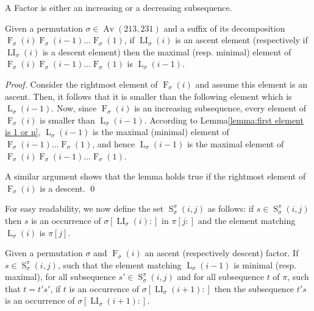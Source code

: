 \documentclass[a4paper]{llncs}
\DeclareMathOperator{\AV}{Av}
\newcommand{\ptext}{\pi}
\newcommand{\pmotif}{\sigma}
\DeclareMathOperator{\firsta}{L}
\newcommand{\first}[2]{\firsta_{{#1}}({#2})}
\DeclareMathOperator{\firstia}{LI}
\newcommand{\firsti}[2]{\firstia_{{#1}}({#2})}
\DeclareMathOperator{\factora}{F}
\newcommand{\factor}[2]{\factora_{{#1}}({#2})}
\DeclareMathOperator{\SETa}{S}
\newcommand{\SET}[4]{\SETa_{{#1}}^{{#2}}({#3},{#4})}
\begin{document}
\begin{remark}
A Factor is either an increasing or a decreasing subsequence.
\end{remark}

\begin{lemma}
\label{lemma:whereIsMax}
Given a permutation $\sigma \in \AV(213,231)$ and a suffix of its decomposition $\factor{\sigma}{i}\factor{\sigma}{i-1}\ldots\factor{\sigma}{1}$, if
$\firsti{\sigma}{i}$ is an ascent element (respectively  if $\firsti{\sigma}{i}$ is a descent element) then the maximal (resp. minimal) element of $\factor{\sigma}{i}\factor{\sigma}{i-1}\ldots\factor{\sigma}{1}$ is $\first{\sigma}{i-1}$.
\end{lemma}

\begin{proof}
Consider the rightmost element of $\factor{\sigma}{i}$ and assume this element is an ascent.
Then, it follows that it is smaller than the following element which is $\first{\sigma}{i-1}$.
Now, since $\factor{\sigma}{i}$ is an increasing subsequence, every element of
$\factor{\sigma}{i}$ is smaller than $\first{\sigma}{i-1}$.
According to Lemma\ref{lemma:first element is 1 or n}, $\first{\sigma}{i-1}$ is the maximal (minimal) element of $\factor{\sigma}{i-1}\ldots\factor{\sigma}{1}$, and hence
$\first{\sigma}{i-1}$ is the maximal  element of
$\factor{\sigma}{i}\factor{\sigma}{i-1}\ldots\factor{\sigma}{1}$.

A similar argument shows that the lemma holds true if the rightmost element
of $\factor{\sigma}{i}$ is a descent.
\qed
\end{proof}

For easy readability, we now define the set
$\SET{\pmotif}{\ptext}{i}{j}$ as follows:
if $s \in \SET{\pmotif}{\ptext}{i}{j}$ then
$s$ is an occurrence of $\pmotif[\firsti{\pmotif}{i}:]$ in $\ptext[j:]$
and the element matching $\first{\pmotif}{i}$ is $\ptext[j]$.

\begin{lemma}
Given a permutation $\pmotif$ and $\factor{\pmotif}{i}$ an ascent (respectively descent) factor.
If $s \in \SET{\pmotif}{\ptext}{i}{j}$, such that the element matching $\first{\pmotif}{i-1}$ is minimal (resp. maximal), for all subsequence 
$s' \in \SET{\pmotif}{\ptext}{i}{j}$ and for all subsequence $t$ of $\ptext$, such that $t=t's'$, if $t$ is an occurrence of $\pmotif[\firsti{\pmotif}{i+1}:]$ then the subsequence $t's$ is an occurrence of $\pmotif[\firsti{\pmotif}{i+1}:]$.
\end{lemma}
\end{document}
